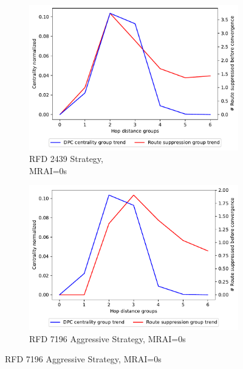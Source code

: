 \begin{figure}[H]
     \centering
     \begin{subfigure}[b]{0.325\textwidth}
         \centering
         \includegraphics[width=\textwidth]{images/RFD/miceVSelephants/MultiMRAI/0/mice/cisco_1000_RFD_nodeConvergence_centVSsup_trend.pdf}
         \caption{RFD 2439 Strategy, \\MRAI=0s}
         \label{fig:1000_2439RFD_centVSsup_mices}
     \end{subfigure}
     \hfill
     \begin{subfigure}[b]{0.325\textwidth}
         \centering
         \includegraphics[width=\textwidth]{images/RFD/miceVSelephants/MultiMRAI/0/mice/cisco_1000_RFD_7196_aggressive_nodeConvergence_centVSsup_trend.pdf}
         \caption{RFD 7196 Aggressive Strategy, MRAI=0s}
         \label{fig:1000_7196RFDA_centVSsup_mices}

\end{subfigure}
\end{figure}
